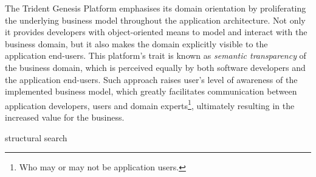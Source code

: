   The Trident Genesis Platform emphasises its domain orientation by proliferating the underlying business model throughout the application architecture.
  Not only it provides developers with object-oriented means to model and interact with the business domain, but it also makes the domain explicitly visible to the application end-users.
  This platform's trait is known as \emph{semantic transparency} of the business domain, which is perceived equally by both software developers and the application end-users.
  Such approach raises user's level of awareness of the implemented business model, which greatly facilitates communication between application developers, users and domain experts\footnote{Who may or may not be application users.}, ultimately resulting in the increased value for the business.
 


structural search
